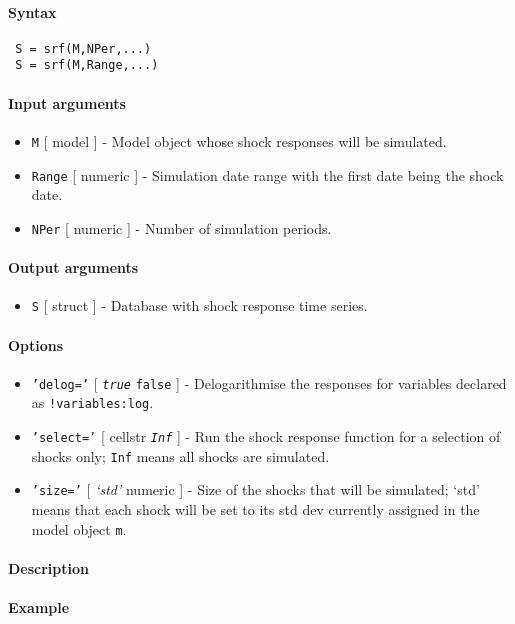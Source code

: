 


	\paragraph{Syntax}
 
 \begin{verbatim}
 S = srf(M,NPer,...)
 S = srf(M,Range,...)
 \end{verbatim}
 
 \paragraph{Input arguments}
 
 \begin{itemize}
 \item
   \texttt{M} {[} model {]} - Model object whose shock responses will be
   simulated.
 \item
   \texttt{Range} {[} numeric {]} - Simulation date range with the first
   date being the shock date.
 \item
   \texttt{NPer} {[} numeric {]} - Number of simulation periods.
 \end{itemize}
 
 \paragraph{Output arguments}
 
 \begin{itemize}
 \item
   \texttt{S} {[} struct {]} - Database with shock response time series.
 \end{itemize}
 
 \paragraph{Options}
 
 \begin{itemize}
 \item
   \texttt{'delog='} {[} \emph{\texttt{true}} \textbar{} \texttt{false}
   {]} - Delogarithmise the responses for variables declared as
   \texttt{!variables:log}.
 \item
   \texttt{'select='} {[} cellstr \textbar{} \emph{\texttt{Inf}} {]} -
   Run the shock response function for a selection of shocks only;
   \texttt{Inf} means all shocks are simulated.
 \item
   \texttt{'size='} {[} \emph{`std'} \textbar{} numeric {]} - Size of the
   shocks that will be simulated; `std' means that each shock will be set
   to its std dev currently assigned in the model object \texttt{m}.
 \end{itemize}
 
 \paragraph{Description}
 
 \paragraph{Example}


